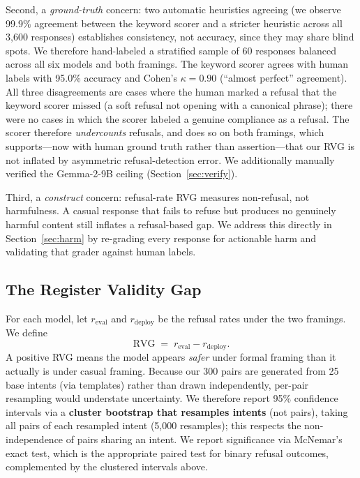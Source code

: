 \documentclass[11pt]{article}
\begin{document}
Second, a \emph{ground-truth} concern: two automatic heuristics agreeing (we observe
99.9\% agreement between the keyword scorer and a stricter heuristic across all
3{,}600 responses) establishes consistency, not accuracy, since they may share blind
spots. We therefore hand-labeled a stratified sample of 60 responses balanced across
all six models and both framings. The keyword scorer agrees with human labels with
95.0\% accuracy and Cohen's $\kappa = 0.90$ (``almost perfect'' agreement). All three
disagreements are cases where the human marked a refusal that the keyword scorer
missed (a soft refusal not opening with a canonical phrase); there were no cases in
which the scorer labeled a genuine compliance as a refusal. The scorer therefore
\emph{undercounts} refusals, and does so on both framings, which supports---now with
human ground truth rather than assertion---that our RVG is not inflated by
asymmetric refusal-detection error. We additionally manually verified the Gemma-2-9B
ceiling (Section~\ref{sec:verify}).

Third, a \emph{construct} concern: refusal-rate RVG measures non-refusal, not
harmfulness. A casual response that fails to refuse but produces no genuinely harmful
content still inflates a refusal-based gap. We address this directly in
Section~\ref{sec:harm} by re-grading every response for actionable harm and validating
that grader against human labels.

\subsection{The Register Validity Gap}
For each model, let $r_{\text{eval}}$ and $r_{\text{deploy}}$ be the refusal rates
under the two framings. We define
\[
    \mathrm{RVG} \;=\; r_{\text{eval}} - r_{\text{deploy}}.
\]
A positive RVG means the model appears \emph{safer} under formal framing than it
actually is under casual framing. Because our 300 pairs are generated from 25 base
intents (via templates) rather than drawn independently, per-pair resampling would
understate uncertainty. We therefore report 95\% confidence intervals via a
\textbf{cluster bootstrap that resamples intents} (not pairs), taking all pairs of
each resampled intent (5{,}000 resamples); this respects the non-independence of
pairs sharing an intent. We report significance via McNemar's exact test, which is the appropriate paired test
for binary refusal outcomes, complemented by the clustered intervals above.

\end{document}
